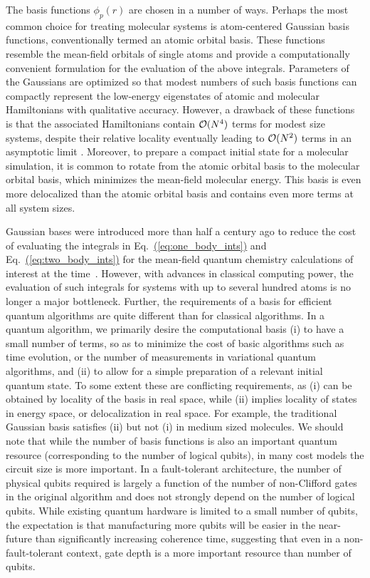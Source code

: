 \documentclass[superscriptaddress,aps,pra,nofootinbib,notitlepage,10pt,longbibliography]{revtex4-1}
\newcommand{\eq}[1]{Eq.~\hyperref[eq:#1]{(\ref*{eq:#1})}}
\begin{document}
The basis functions $\phi_p(r)$ are chosen in a number of ways.  Perhaps the most common choice for treating molecular systems is  atom-centered Gaussian basis functions, conventionally termed an atomic orbital basis. These functions resemble the mean-field orbitals of single atoms and provide a computationally convenient formulation for the evaluation of the above integrals. Parameters of the Gaussians are optimized so that modest numbers of such basis functions can compactly represent the low-energy eigenstates of atomic and molecular Hamiltonians with qualitative accuracy. However, a drawback of these functions is that the associated Hamiltonians contain ${\cal O}(N^4)$ terms for modest size systems, despite their relative locality eventually leading to ${\cal O}(N^2)$ terms in an asymptotic limit \cite{McClean2014}. Moreover, to prepare a compact initial state for a molecular simulation, it is common to rotate from the atomic orbital basis to the molecular orbital basis, which minimizes the mean-field molecular energy. This basis is even more delocalized than the atomic orbital basis and contains even more terms at all system sizes.

Gaussian bases were introduced more than half a century ago to reduce the cost of evaluating the integrals in \eq{one_body_ints} and \eq{two_body_ints} for the mean-field quantum chemistry calculations of interest at the time~\cite{boys1950electronic}. However, with advances in classical computing power, the evaluation of such integrals for systems with up to several hundred atoms is no longer a major bottleneck. Further, the requirements of a basis for efficient quantum algorithms are quite different than for classical algorithms. In a quantum algorithm, we primarily desire the computational basis (i) to have a small number of terms, so as to minimize the cost of basic algorithms such as time evolution, or the number of measurements in variational quantum algorithms, and (ii) to allow for a simple preparation of a relevant initial quantum state.
To some extent these are conflicting requirements, as (i) can be obtained by locality of the basis in real space, while (ii) implies locality of states in energy space, or delocalization in real space. For example, the traditional Gaussian basis satisfies (ii) but not (i) in medium sized molecules. We should note that while the number of basis functions is also an important quantum resource (corresponding to the number of logical qubits), in many cost models the circuit size is more important. In a fault-tolerant architecture, the number of physical qubits required is largely a function of the number of non-Clifford gates in the original algorithm and does not strongly depend on the number of logical qubits. While existing quantum hardware is limited to a small number of qubits, the expectation is that manufacturing more qubits will be easier in the near-future than significantly increasing coherence time, suggesting that even in a non-fault-tolerant context, gate depth is a more important resource than number of qubits.
\end{document}
